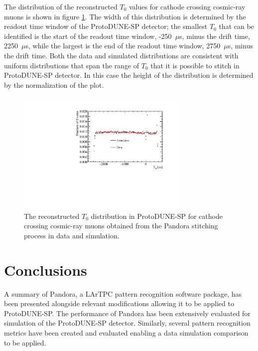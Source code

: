 The distribution of the reconstructed $T_{0}$ values for cathode crossing cosmic-ray muons is shown in figure \ref{fig:recoT0data}.  The width of this distribution is determined by the readout time window of the ProtoDUNE-SP detector; the smallest $T_{0}$ that can be identified is the start of the readout time window, -250~$\mu$s, minus the drift time, 2250~$\mu$s, while the largest is the end of the readout time window, 2750~$\mu$s, minus the drift time.  Both the data and simulated distributions are consistent with uniform distributions that span the range of $T_{0}$ that it is possible to stitch in ProtoDUNE-SP detector.  In this case the height of the distribution is determined by the normalization of the plot.


\begin{figure}
\centering
\includegraphics[width=0.75\textwidth]{Figures/Metrics/Data/Cosmics/StitchedT0.pdf}
\caption{The reconstructed $T_{0}$ distribution in ProtoDUNE-SP for cathode crossing cosmic-ray muons obtained from the Pandora stitching process in data and simulation.}
\label{fig:recoT0data}
\end{figure}

\section{Conclusions}
A summary of Pandora, a LArTPC pattern recognition software package, has been presented alongside relevant modifications allowing it to be applied to ProtoDUNE-SP.  The performance of Pandora has been extensively evaluated for simulation of the ProtoDUNE-SP detector.  Similarly, several pattern recognition metrics have been created and evaluated enabling a data simulation comparison to be applied.

